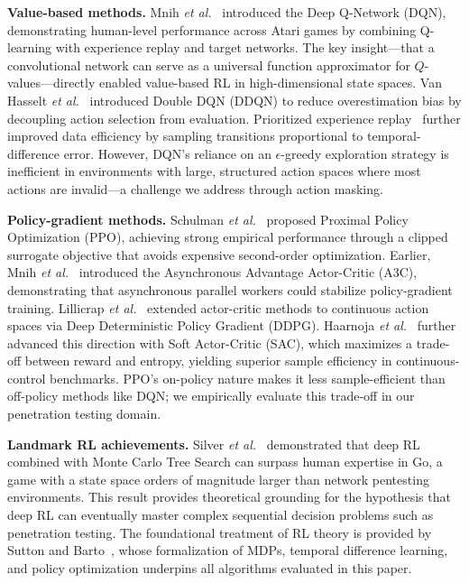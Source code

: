 \documentclass[conference]{IEEEtran}
\begin{document}
\textbf{Value-based methods.}
Mnih \emph{et al.}~\cite{mnih2015nature} introduced the Deep Q-Network
(DQN), demonstrating human-level performance across Atari games by
combining Q-learning with experience replay and target networks.  The
key insight---that a convolutional network can serve as a universal
function approximator for $Q$-values---directly enabled value-based RL
in high-dimensional state spaces.  Van Hasselt \emph{et
al.}~\cite{vanhasselt2016doubledqn} introduced Double DQN (DDQN) to
reduce overestimation bias by decoupling action selection from
evaluation.  Prioritized experience replay~\cite{schaul2016per}
further improved data efficiency by sampling transitions proportional
to temporal-difference error.  However, DQN's reliance on an
$\epsilon$-greedy exploration strategy is inefficient in environments
with large, structured action spaces where most actions are invalid---a
challenge we address through action masking.

\textbf{Policy-gradient methods.}
Schulman \emph{et al.}~\cite{schulman2017ppo} proposed Proximal Policy
Optimization (PPO), achieving strong empirical performance through a
clipped surrogate objective that avoids expensive second-order
optimization.  Earlier, Mnih \emph{et al.}~\cite{mnih2016a3c}
introduced the Asynchronous Advantage Actor-Critic (A3C), demonstrating
that asynchronous parallel workers could stabilize policy-gradient
training.  Lillicrap \emph{et al.}~\cite{lillicrap2016ddpg} extended
actor-critic methods to continuous action spaces via Deep Deterministic
Policy Gradient (DDPG).  Haarnoja \emph{et al.}~\cite{haarnoja2018sac}
further advanced this direction with Soft Actor-Critic (SAC), which
maximizes a trade-off between reward and entropy, yielding superior
sample efficiency in continuous-control benchmarks.  PPO's on-policy
nature makes it less sample-efficient than off-policy methods like DQN;
we empirically evaluate this trade-off in our penetration testing domain.

\textbf{Landmark RL achievements.}
Silver \emph{et al.}~\cite{silver2016alphago} demonstrated that deep RL
combined with Monte Carlo Tree Search can surpass human expertise in Go,
a game with a state space orders of magnitude larger than network
pentesting environments.  This result provides theoretical grounding for
the hypothesis that deep RL can eventually master complex sequential
decision problems such as penetration testing.  The foundational
treatment of RL theory is provided by Sutton and
Barto~\cite{suttonbarto2018}, whose formalization of MDPs, temporal
difference learning, and policy optimization underpins all algorithms
evaluated in this paper.
\end{document}
